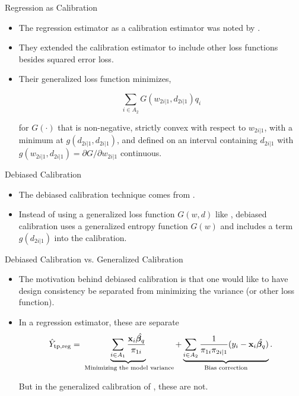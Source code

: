 \documentclass{beamer} %
\renewcommand{\bf}[1]{\mathbf{#1}}
\begin{document}
\begin{frame}{Regression as Calibration}

  \begin{itemize}
    \item The regression estimator as a calibration estimator was noted by
      \cite{deville1992calibration}.
    \item They extended the calibration estimator to include other loss
      functions besides squared error loss.
    \item Their generalized loss function minimizes,

      $$\sum_{i \in A_2} G(w_{2i|1}, d_{2i|1})q_i$$

      for $G(\cdot)$ that is non-negative, strictly convex with respect to $w_{2i|1}$,
      with a minimum at $g(d_{2i|1}, d_{2i|1})$,
      and defined on an interval containing $d_{2i|1}$ with $g(w_{2i|1}, d_{2i|1})
      = \partial G / \partial w_{2i|1}$ continuous.
  \end{itemize}

\end{frame}

\begin{frame}{Debiased Calibration}

  \begin{itemize}
    \item The debiased calibration technique comes from \cite{kwon2024debiased}.
    \item Instead of using a generalized loss function $G(w, d)$ like 
      \cite{deville1992calibration}, debiased calibration uses a generalized
      entropy function \autocite{gneiting2007strictly} $G(w)$ and includes a
      term $g(d_{2i|1})$ into the calibration.
  \end{itemize}

\end{frame}

\begin{frame}{Debiased Calibration vs. Generalized Calibration}

  \begin{itemize}
    \item The motivation behind debiased calibration is that one would like to
      have design consistency be separated from minimizing the variance (or
      other loss function).
    \item In a regression estimator, these are separate
      $$ \hat Y_{\rm{tp, reg}} 
      = \underbrace{\sum_{i \in A_1} \frac{\bf x_i \hat{\bm \beta_q}}{\pi_{1i}}}_{
        \text{ Minimizing the model variance}} + \underbrace{\sum_{i \in A_2}
      \frac{1}{\pi_{1i}\pi_{2i|1}} (y_i - \bf x_i \hat{\bm \beta_q})}_{
      \text{Bias correction}}.$$

      But in the generalized calibration of \cite{deville1992calibration},
      these are not.
  \end{itemize}

\end{frame}
\end{document}
